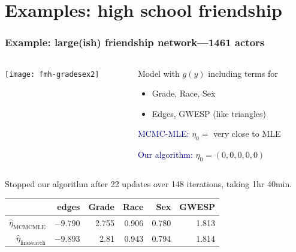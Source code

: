 \documentclass[ 10pt]{beamer}
\begin{document}
\section{Examples: high school friendship}

\frame
{
  \frametitle{Example: large(ish) friendship network---1461 actors}  
\begin{columns}[t]
\begin{column}[T]{0.3\textwidth}
\texttt{[image: fmh-gradesex2]}
\end{column}

\begin{column}[T]{0.7\textwidth}
Model with $g(y)$ including terms for
\vspace{1mm}
\begin{itemize}
\item Grade, Race, Sex
\vspace{1mm}

\item Edges, GWESP (like triangles)
\vspace{5mm}
\end{itemize}

\textcolor{darkblue}{MCMC-MLE:}  \hspace{1mm} $\eta_0 =$ very close to MLE

\textcolor{darkblue}{Our algorithm:} $\eta_0 = (0,0,0,0,0)$
\end{column}
\end{columns}
\vspace{5mm}

Stopped our algorithm after 22 updates over 148 iterations, taking 1hr 40min.
\begin{table}
\begin{center} 
\begin{tabular}{rrrrrr}
  \hline
 & edges & Grade & Race & Sex & GWESP \\ 
  \hline
$\hat{\eta}_{\textrm{MCMCMLE}}$ & $-9.790$ & 2.755 & 0.906 & 0.780 & 1.813 \\ 
$\hat{\eta}_{\textrm{linesearch}}$ & 	$-9.893$	&	2.81	&	0.943	&	0.794	&	1.814\\ 
   \hline
\end{tabular}\label{T:FauxMagnolia}
\end{center}
\end{table}
}
\end{document}

